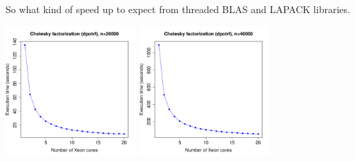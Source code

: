 \documentclass[10pt, xcolor=table]{beamer}
\begin{document}
\begin{frame}
So what kind of speed up to expect from threaded BLAS and LAPACK libraries.
\begin{center}
\includegraphics[width=5cm]{figures/n20k-xeon.pdf}
\includegraphics[width=5cm]{figures/n40k-xeon.pdf}
\end{center}
\end{frame}
\end{document}
